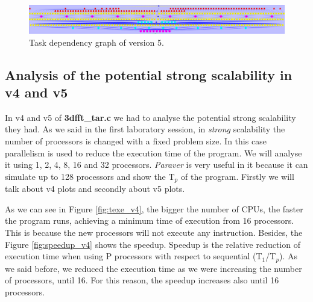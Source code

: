 \documentclass[12pt, a4paper]{article}
\begin{document}
\begin{figure}[H]
  \centering
  \includegraphics[angle=90, scale=0.20]{./images/dependency_graph_v5}
  \caption{Task dependency graph of version 5.}
\end{figure}

\subsection{Analysis of the potential strong scalability in v4 and v5}

\label{Analysis of the potential strong scalability in v4 and v5}

In v4 and v5 of \textbf{3dfft\_tar.c} we had to analyse the potential strong scalability they had. As we said in the first laboratory session, in \textit{strong} scalability the number of processors is changed with a fixed problem size. In this case parallelism is used to reduce the execution time of the program. We will analyse it using 1, 2, 4, 8, 16 and 32 processors. \textit{Paraver} is very useful in it because it can simulate up to 128 processors and show the T$_p$ of the program. Firstly we will talk about v4 plots and secondly about v5 plots.

As we can see in Figure \ref{fig:texe_v4}, the bigger the number of CPUs, the faster the program runs, achieving a minimum time of execution from 16 processors. This is because the new processors will not execute any instruction. Besides, the Figure \ref{fig:speedup_v4} shows the speedup. Speedup is the relative reduction of execution time when using P processors with respect to sequential (T$_1$/T$_p$). As we said before, we reduced the execution time as we were increasing the number of processors, until 16. For this reason, the speedup increases also until 16 processors.
\end{document}

